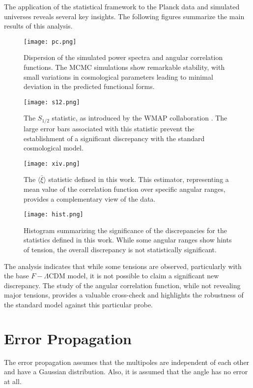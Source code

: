 \documentclass{article}
\theoremstyle{definition}
\begin{document}
The application of the statistical framework to the Planck data and simulated universes reveals several key insights. The following figures summarize the main results of this analysis.

\begin{figure}[H]
    \centering
    \texttt{[image: pc.png]}
    \caption{Dispersion of the simulated power spectra and angular correlation functions. The MCMC simulations show remarkable stability, with small variations in cosmological parameters leading to minimal deviation in the predicted functional forms.}
    \label{fig:esp-cor}
\end{figure}

\begin{figure}[H]
    \centering
    \texttt{[image: s12.png]}
    \caption{The $S_{1/2}$ statistic, as introduced by the WMAP collaboration \autocite{Spergel_2003}. The large error bars associated with this statistic prevent the establishment of a significant discrepancy with the standard cosmological model.}
    \label{fig:s12}
\end{figure}

\begin{figure}[H]
    \centering
    \texttt{[image: xiv.png]}
    \caption{The $\bar{\langle\xi\rangle}$ statistic defined in this work. This estimator, representing a mean value of the correlation function over specific angular ranges, provides a complementary view of the data.}
    \label{fig:xiv}
\end{figure}

\begin{figure}[H]
    \centering
    \texttt{[image: hist.png]}
    \caption{Histogram summarizing the significance of the discrepancies for the statistics defined in this work. While some angular ranges show hints of tension, the overall discrepancy is not statistically significant.}
    \label{fig:hist}
\end{figure}

The analysis indicates that while some tensions are observed, particularly with the base $F-\Lambda$CDM model, it is not possible to claim a significant new discrepancy. The study of the angular correlation function, while not revealing major tensions, provides a valuable cross-check and highlights the robustness of the standard model against this particular probe.

\appendix
\section{Error Propagation}
The error propagation assumes that the multipoles are independent of each other and have a Gaussian distribution. Also, it is assumed that the angle has no error at all.
\end{document}
